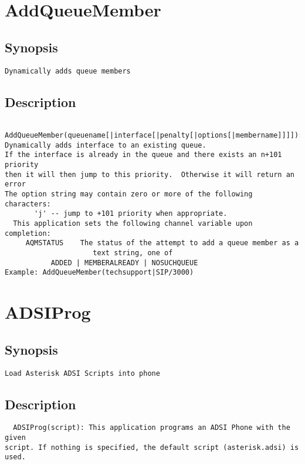 \section{AddQueueMember}
\subsection{Synopsis}
\begin{verbatim}
Dynamically adds queue members
\end{verbatim}
\subsection{Description}
\begin{verbatim}
   AddQueueMember(queuename[|interface[|penalty[|options[|membername]]]]):
Dynamically adds interface to an existing queue.
If the interface is already in the queue and there exists an n+101 priority
then it will then jump to this priority.  Otherwise it will return an error
The option string may contain zero or more of the following characters:
       'j' -- jump to +101 priority when appropriate.
  This application sets the following channel variable upon completion:
     AQMSTATUS    The status of the attempt to add a queue member as a 
                     text string, one of
           ADDED | MEMBERALREADY | NOSUCHQUEUE 
Example: AddQueueMember(techsupport|SIP/3000)

\end{verbatim}


\section{ADSIProg}
\subsection{Synopsis}
\begin{verbatim}
Load Asterisk ADSI Scripts into phone
\end{verbatim}
\subsection{Description}
\begin{verbatim}
  ADSIProg(script): This application programs an ADSI Phone with the given
script. If nothing is specified, the default script (asterisk.adsi) is used.

\end{verbatim}


